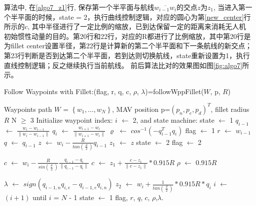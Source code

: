     \par 算法中, 在\ref{algo7_z1}行, 保存第一个半平面与航线$\overline{w_{i-1}w_{i}}$的交点$z$为$z_{1}$, 
    当进入第一个半平面的时候，state = 2，执行曲线控制逻辑，对应的圆心为第\ref{new_center}行所示的$c$, 其中半径进行了一定比例的缩放，已到达保留一定的距离来消耗无人机初始惯性动量的目的。第20行和22行，对应的R都进行了比例缩放，其中第20行是为fillet center设置半径，第22行是计算新的第二个半平面和下一条航线的新交点；第23行判断是否到达第二个半平面，若到达则切换航线，state重新设置为1，执行直线控制逻辑；反之继续执行当前航线。
    前后算法比对的效果图如图\ref{fig:algo7}所示。
    \begin{algorithm}[t] %
        \caption{Follow Waypoints with Fillet:(flag, r, q, c, $\rho$, $\lambda$)=followWppFillet($\textit{W}$, p, $R$)}
        \label{algo6_opti:ref}
        \begin{algorithmic}[1]
            \ENSURE Waypoints path $\textit{W}$ = $\left\{ w_{1}, \dots, w_{N} \right\}$, MAV position p=$(p_{n}, p_{e}, p_{d})^{T}$, fillet radius $R$
            \REQUIRE N $\geq$ 3
                \STATE Initialize waypoint index: $i$ $\gets$ 2, and state machine: state $\gets$ 1
            \ENDIF
            \STATE $q_{i-1}$ $\gets$ $\frac{w_{i}-w_{i-1}}{\lVert w_{i}-w_{i-1} \rVert}$
            \STATE $q_{i}$ $\gets$ $\frac{w_{i+1}-w_{i}}{\lVert w_{i+1}-w_{i} \rVert}$
            \STATE $\varrho$ $\gets$ $cos^{-1}(-q_{i-1}^{T}q_{i})$
                \STATE flag $\gets$ 1
                \STATE $r$ $\gets$ $w_{i-1}$
                \STATE $q$ $\gets$ $q_{i-1}$
                \STATE $z$ $\gets$ $w_{i} - \frac{R}{tan(\frac{\varrho}{2})}q_{i-1}$
                \STATE $z_{1}$ $\gets$ $z$     \label{algo7_z1}   
                    \STATE state $\gets$ 2
                \ENDIF
                \STATE flag $\gets$ 2
                
                \STATE $c$ $\gets$ $w_{i} - \frac{R}{sin(\frac{\varrho}{2})}\frac{q_{i-1}-q_{i}}{\lVert q_{i-1}-q_{i} \rVert}$
                \STATE $c$ $\gets$ $z_{1} + \frac{c-z_{1}}{\lVert c-z_{1}\rVert}*0.915R$ %
                \label{new_center}
                \STATE $\rho$ $\gets$ $0.915R$

                \STATE $\lambda$ $\gets$ $sign(q_{i-1,n}q_{i,e}-q_{i-1,e}q_{i,n})$
                \STATE $z_{2}$ $\gets$ $w_{i} + \frac{1}{tan(\frac{\varrho}{2})}*0.915R*q_{i}$
                    \STATE $i$ $\gets$ $\left(i+1\right)$ until $i$ = $N$ - 1
                    \STATE state $\gets$ 1
                \ENDIF
            \ENDIF
            \RETURN flag, $r$, $q$, $c$, $\rho$,$\lambda$.  %
        \end{algorithmic}
    \end{algorithm}
